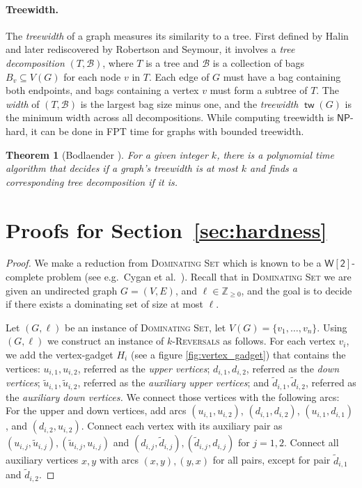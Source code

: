 \documentclass[11pt, twoside]{article}
\numberwithin{equation}{section}
\numberwithin{table}{section}
\numberwithin{figure}{section}
\newtheorem{theorem}{Theorem}[section]
\theoremstyle{definition}
\theoremstyle{definition}
\theoremstyle{definition}
\newcommand{\tw}{\operatorname{\mathsf{tw}}}
\def\NP{\mathsf{NP}}
\def\W2{\mathsf{W[2]}}
\newcommand{\tu}[1]{\widetilde{u}_{#1}}
\newcommand{\td}[1]{\widetilde{d}_{#1}}
\begin{document}
\begin{appendices}
\paragraph{Treewidth.}
The \emph{treewidth} of a graph measures its similarity to a tree. First defined by Halin and later rediscovered by Robertson and Seymour, it involves a \emph{tree decomposition} \((T, \mathcal{B})\), where \(T\) is a tree and \(\mathcal{B}\) is a collection of bags \(B_v \subseteq V(G)\) for each node \(v\) in \(T\). Each edge of \(G\) must have a bag containing both endpoints, and bags containing a vertex \(v\) must form a subtree of \(T\). The \emph{width} of \((T, \mathcal{B})\) is the largest bag size minus one, and the \emph{treewidth} \(\tw(G)\) is the minimum width across all decompositions. While computing treewidth is \(\NP\)-hard, it can be done in FPT time for graphs with bounded treewidth.

\begin{theorem} [Bodlaender \cite{bodlaender1996treewidth}] \label{thm_treewidth}
For a given integer $k$, there is a polynomial time algorithm that decides if a graph's treewidth is at most $k$ and finds a corresponding tree decomposition if it is.
\end{theorem}


\section{Proofs for Section~\ref{sec:hardness}}
\thmWtwoHardByk*
\begin{proof}
   We make a reduction from \textsc{Dominating Set} which is known to be a $\W2$-complete problem (see e.g.\ Cygan et al.~\cite{cygan2015parameterized}). Recall that in \textsc{Dominating Set} we are given an undirected graph $G = (V,E)$, and $\ell \in \mathbb{Z}_{\geq 0}$, and the goal is to decide if there exists a dominating set of size at most $\ell$.
   
   Let $(G,\ell)$ be an instance of \textsc{Dominating Set}, let $V(G) = \{ v_1, \dots, v_n \}$. Using $(G,\ell)$ we construct an instance of \textsc{$k$-Reversals} as follows. 
    For each vertex $v_i$, we add the vertex-gadget $H_i$ (see a figure \cref{fig:vertex_gadget}) that contains the vertices:  $u_{i,1}, u_{i,2}$, referred as the \textit{upper vertices}; $d_{i,1}, d_{i,2}$, referred as the \textit{down vertices}; $\tu{i,1}, \tu{i,2}$, referred as the \textit{auxiliary upper vertices}; and  $\td{i,1}, \td{i,2}$, referred as the \textit{auxiliary down vertices.}
    We connect those vertices with the following arcs: For the upper and down vertices, add arcs $(u_{i,1}, u_{i,2})$, $(d_{i,1}, d_{i,2})$, $(u_{i,1}, d_{i,1})$, and $(d_{i,2}, u_{i,2})$. Connect each vertex with its auxiliary pair as $(u_{i,j},\tu{i,j}), (\tu{i,j}, u_{i,j})$ and $(d_{i,j},\td{i,j}), (\td{i,j},d_{i,j})$ for $j =1,2$. Connect all auxiliary vertices $x,y$ with arcs $(x,y),(y,x)$ for all pairs, except for pair $\td{i,1}$ and $\td{i,2}$.
    

\end{proof}
\end{appendices}
\end{document}
